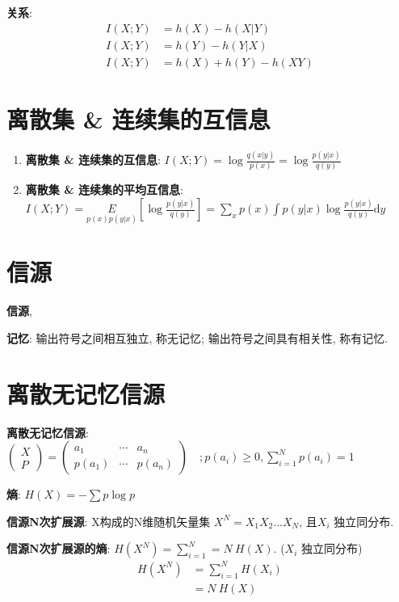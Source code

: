 \documentclass{article}
\newcommand{\env}[2]{\begin{#1}#2\end{#1}}
\newcommand{\defi}[2]{\textbf{#1}, #2}
\newcommand{\d}{\mathrm d}
\newcommand{\l}{\left}
\newcommand{\r}{\right}
\begin{document}
                \textbf{关系}:
                    \env{align*}{
                        I(X;Y) &= h(X)-h(X|Y) \\
                        I(X;Y) &= h(Y)-h(Y|X) \\
                        I(X;Y) &= h(X)+h(Y)-h(X Y)
                    }
                    
            \section{离散集 \& 连续集的互信息}
                \env{enumerate}{
                    \item \textbf{离散集 \& 连续集的互信息}: $I(X;Y)=\log \frac{q(x|y)}{p(x)}=\log \frac{p(y|x)}{q(y)}$
                    \item \textbf{离散集 \& 连续集的平均互信息}: $I(X;Y)=\underset{p(x) p(y|x)}{E}\l[\log \frac{p(y|x)}{q(y)}\r]=\sum_{x} p(x) \int p(y|x) \log \frac{p(y|x)}{q(y)} \d y$
                }
            
            
\section{信源}
    \defi{信源}{}

    \textbf{记忆}: 输出符号之间相互独立, 称无记忆; 输出符号之间具有相关性, 称有记忆.
    
    \section{离散无记忆信源}
        \textbf{离散无记忆信源}: $\l(\begin{array}{l} X \\ P \end{array}\r) = \l(\begin{array}{lll} a_1 & \cdots & a_{n} \\ p\l(a_1\r) & \cdots & p\l(a_{n}\r) \end{array}\r) \quad; p\l(a_{i}\r) \geqslant 0, \sum_{i=1}^N p\l(a_{i}\r)=1$
                
            
        \textbf{熵}: $H(X) = -\sum p \log p$
        
        \textbf{信源N次扩展源}: X构成的N维随机矢量集 $X^N = X_1 X_2...X_N$, 且$X_i$ 独立同分布.

        \textbf{信源N次扩展源的熵}: $H(X^N) = \sum_{i=1}^N = N\ H(X)$. ($X_i$ 独立同分布)
            \env{align*}{
                H(X^N) 
                &= \sum_{i=1}^N H(X_i)  \tag{$X_i$ 独立}\\
                &= N\ H(X)  \tag{$X_i$ 同分布}
            }
        
\end{document}
